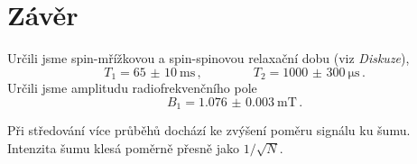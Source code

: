\section*{Závěr}
Určili jsme spin-mřížkovou a spin-spinovou relaxační dobu (viz \emph{Diskuze}),
\begin{equation*}
T_1=\SI{65(10)}{\ms}  \,,\qquad \qquad T_2=\SI{1000(300)}{\us} \,.
\end{equation*}
Určili jsme amplitudu radiofrekvenčního pole
\begin{equation*}
B_1=\SI{1.076(3)}{\milli\tesla} \,.
\end{equation*}

Při středování více průběhů dochází ke zvýšení poměru signálu ku šumu. Intenzita šumu klesá poměrně přesně jako $1/\sqrt{N}$.